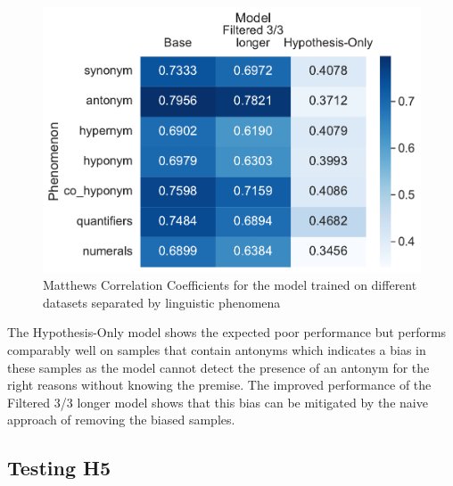 \begin{figure}[ht]
    \centering
    \includegraphics[width=0.9\columnwidth]{./images/metric_heatmaps_phenomena/important_words/matthews_correlation.pdf}
    \caption{Matthews Correlation Coefficients for the model trained on different datasets separated by linguistic phenomena}
    \label{fig:metric-heatmap-phenomena-mcc}
\end{figure}

The Hypothesis-Only model shows the expected poor performance but performs comparably well on samples that contain antonyms which indicates a bias in these samples as the model cannot detect the presence of an antonym for the right reasons without knowing the premise. The improved performance of the Filtered 3/3 longer model shows that this bias can be mitigated by the naive approach of removing the biased samples.

\subsection{Testing H5}
